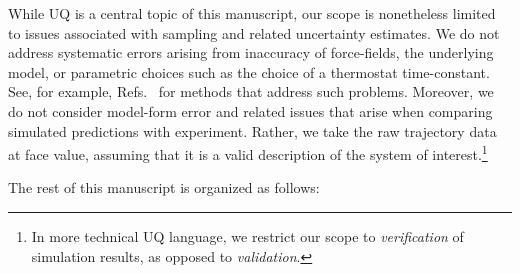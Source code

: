 While UQ is a central topic of this manuscript, our scope is nonetheless limited to issues associated with sampling and related uncertainty estimates.  We do not address systematic errors arising from inaccuracy of force-fields, the underlying model, or parametric choices such as the choice of a thermostat time-constant.  See, for example, Refs.~\cite{Limecooler,Rizzi2,Rizzi3,Rizzi4} for methods that address such problems.  Moreover, we do not consider model-form error and related issues that arise when comparing simulated predictions with experiment.  Rather, we take the raw trajectory data at face value, assuming that it is a valid description of the system of interest.\footnote{In more technical UQ language, we restrict our scope to {\it verification} of simulation results, as opposed to {\it validation}.}

The rest of this manuscript is organized as follows: 




